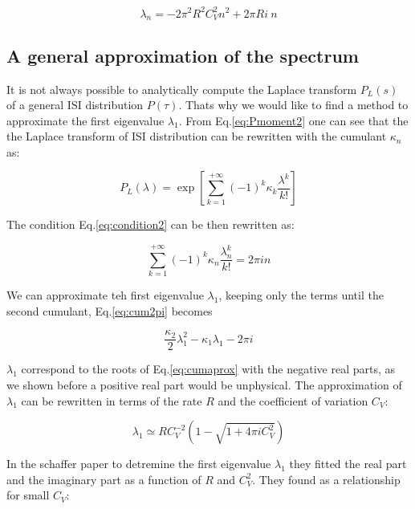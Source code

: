 \documentclass[a4paper,11pt,twoside]{article}
\numberwithin{equation}{section}
\begin{document}
\begin{equation}
\lambda_n=- 2\pi^2R^2C_V^2n^2+2\pi R i\:n
\end{equation}

\subsection{A general approximation of the spectrum}

It is not always possible to analytically compute the Laplace transform $P_L(s)$ of a general ISI distribution $P(\tau)$. Thats why we would like to find a method to approximate the first eigenvalue $\lambda_1$. From Eq.\eqref{eq:Pmoment2} one can see that the the Laplace transform of ISI distribution can be rewritten with the cumulant $\kappa_n$ as:

\begin{equation}
\label{eq:PLcum}
P_L(\lambda)=\exp\left[ \sum_{k=1}^{+\infty}(-1)^k\kappa_k \frac{\lambda^k}{k!}\right]
\end{equation}

The condition Eq.\eqref{eq:condition2} can be then rewritten as:

\begin{equation}
\label{eq:cum2pi}
 \sum_{k=1}^{+\infty}(-1)^k\kappa_n \frac{\lambda_n^k}{k!}=2 \pi i n
\end{equation}

We can approximate teh first eigenvalue $\lambda_1$, keeping only the terms until the second cumulant, Eq.\eqref{eq:cum2pi} becomes

\begin{equation}
\label{eq:cumaprox}
\frac{\kappa_2}{2}\lambda_1^2-\kappa_1\lambda_1 -2\pi i
\end{equation}

$\lambda_1$ correspond to the roots of Eq.\eqref{eq:cumaprox} with the negative real parts, as we shown before a positive real part would be unphysical. The approximation of $\lambda_1$ can be rewritten in terms of the rate $R$ and the coefficient of variation $C_V$: 

\begin{equation}
\label{eq:l1aprox}
\lambda_1\simeq RC_V^{-2}\left( 1-\sqrt{1+4\pi i C_V^2}\right)
\end{equation}

In the schaffer paper to detremine the first eigenvalue $\lambda_1$ they fitted the real part and the imaginary part as a function of $R$ and $C_V^2$. They found as a relationship for small $C_V$:
\end{document}
